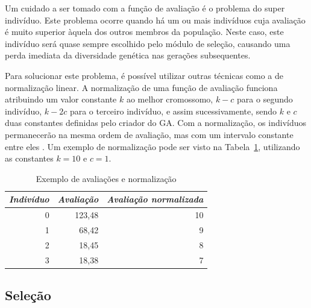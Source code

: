 \documentclass[12pt,oneside,a4paper,english,french,spanish,brazil,]{abntex2}
\begin{document}
Um cuidado a ser tomado com a função de avaliação é o problema do super indivíduo. Este problema ocorre quando há um ou mais indivíduos cuja avaliação é muito superior àquela dos outros membros da população. Neste caso, este indivíduo será quase sempre escolhido pelo módulo de seleção, causando uma perda imediata da diversidade genética nas gerações subsequentes.

Para solucionar este problema, é possível utilizar outras técnicas como a de normalização linear. A normalização de uma função de avaliação funciona atribuindo um valor constante \(k\) ao melhor cromossomo, \(k - c\) para o segundo indivíduo, \(k - 2c\) para o terceiro indivíduo, e assim sucessivamente, sendo \(k\) e \(c\) duas constantes definidas pelo criador do GA. Com a normalização, os indivíduos permanecerão na mesma ordem de avaliação, mas com um intervalo constante entre eles  \cite{linden:2008}. Um exemplo de normalização pode ser visto na Tabela~\ref{tab:Normalizacao_Avaliacao}, utilizando as constantes \(k = 10\) e \(c = 1\).

\begin{table}[!htbp]
\centering
\caption{Exemplo de avaliações e normalização}
\label{tab:Normalizacao_Avaliacao}
\begin{tabular}{rrr}
\hline
\multicolumn{1}{l}{\textit{\textbf{Indivíduo}}} & \multicolumn{1}{l}{\textit{\textbf{Avaliação}}} & \multicolumn{1}{l}{\textit{\textbf{Avaliação normalizada}}} \\ \hline
0                                                & 123,48                                           & 10                                                           \\
1                                                & 68,42                                            & 9                                                            \\
2                                                & 18,45                                            & 8                                                            \\
3                                                & 18,38                                            & 7    \\ \hline                                                       
\end{tabular}
\end{table}

\subsection{Seleção}
\end{document}
